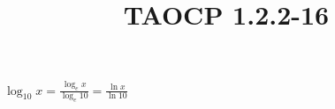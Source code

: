 \documentclass{article}
\title{TAOCP 1.2.2\mbox{-}16}
\begin{document}
\maketitle

\( \log_{10}{x} = \frac{\log_e{x}}{\log_e{10}} = \frac{\ln{x}}{\ln{10}} \)
\end{document}
